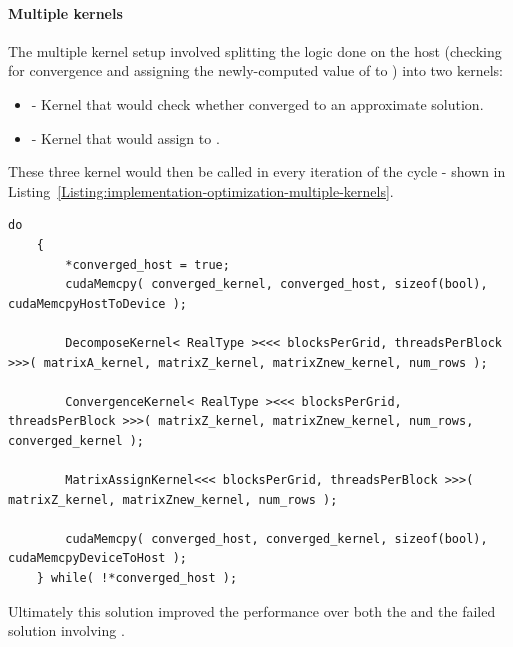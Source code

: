 \paragraph{Multiple kernels} The multiple kernel setup involved splitting the logic done on the host (checking for convergence and assigning the newly-computed value of  to ) into two kernels:

\begin{itemize}
	\item {} - Kernel that would check whether  converged to an approximate solution.
	\item {} - Kernel that would assign  to .
\end{itemize}

These three kernel would then be called in every iteration of the  cycle - shown in Listing~\ref{Listing:implementation-optimization-multiple-kernels}.

\begin{lstlisting}[caption={Solution that replaced the procedure presented on lines~\ref{Line:initial-naive-implementation-convergence-checking-begin} - \ref{Line:initial-naive-implementation-convergence-checking-end} in Listing~\ref{Listing:implementation-optimization-initial-naive-implementation}. Taken from the Decomposition project repository on GitLab\protect\footref{Footnote:decomposition-project-gitlab-url}.},label={Listing:implementation-optimization-multiple-kernels},escapechar=@]
	do
	{
		*converged_host = true;
		cudaMemcpy( converged_kernel, converged_host, sizeof(bool), cudaMemcpyHostToDevice );
		
		DecomposeKernel< RealType ><<< blocksPerGrid, threadsPerBlock >>>( matrixA_kernel, matrixZ_kernel, matrixZnew_kernel, num_rows );
		
		ConvergenceKernel< RealType ><<< blocksPerGrid, threadsPerBlock >>>( matrixZ_kernel, matrixZnew_kernel, num_rows, converged_kernel );
		
		MatrixAssignKernel<<< blocksPerGrid, threadsPerBlock >>>( matrixZ_kernel, matrixZnew_kernel, num_rows );
		
		cudaMemcpy( converged_host, converged_kernel, sizeof(bool), cudaMemcpyDeviceToHost );
	} while( !*converged_host );
\end{lstlisting}

Ultimately this solution improved the performance over both the \textit{} and the failed solution involving \textit{}.

